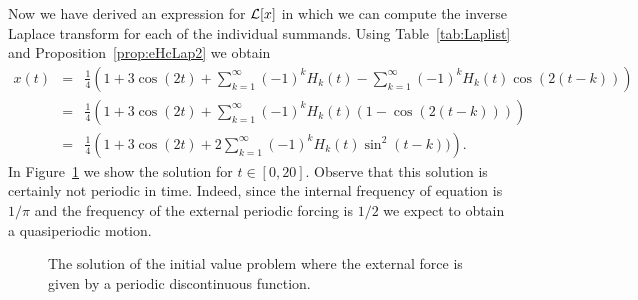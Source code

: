 Now we have derived an expression for ${\cal L}[x]$ in which we can compute the
inverse Laplace transform for each of the individual summands.  Using 
Table~\ref{tab:Laplist} and Proposition~\ref{prop:eHcLap2} we obtain
\begin{eqnarray*}
x(t)&=&\frac{1}{4}\left(1+3\cos(2t)+\sum_{k=1}^\infty (-1)^k H_k(t)
       -\sum_{k=1}^\infty (-1)^k H_k(t)\cos(2(t-k))\right)\\
&=&\frac{1}{4}\left(1+3\cos(2t)+\sum_{k=1}^\infty (-1)^k H_k(t)(1-\cos(2(t-k)))\right)\\
&=&\frac{1}{4}\left(1+3\cos(2t)+2\sum_{k=1}^\infty (-1)^k H_k(t)\sin^2(t-k))\right).
\end{eqnarray*}
In Figure~\ref{fig:lapperi} we show the solution for $t\in [0,20]$.  Observe 
that this solution is certainly not periodic in time.  Indeed, since the 
internal frequency of equation  is 
$1/\pi$ and the frequency of the external periodic forcing is $1/2$ we expect 
to obtain a quasiperiodic motion.
\begin{figure}[htb]
           \centerline{%
           }
           \caption{The solution of the initial value problem
	   \protect{} where the external force is
   	   given by a periodic discontinuous function.}
           \label{fig:lapperi}
\end{figure}






